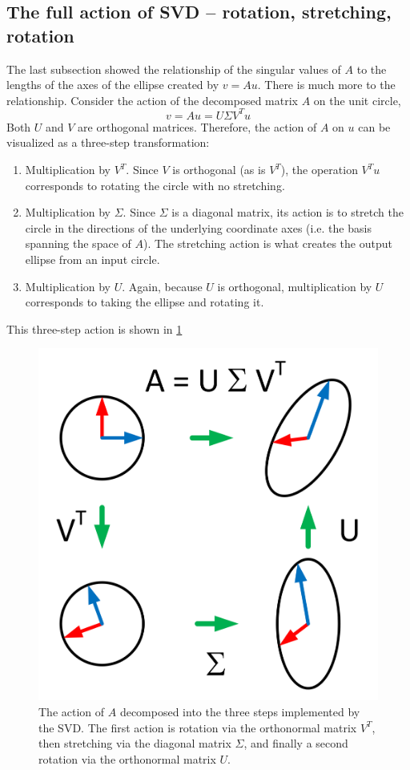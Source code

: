 \documentclass[onefignum,onetabnum]{siamart190516}
\begin{document}
\subsection{The full action of SVD -- rotation, stretching, rotation}
\label{rotstretchrot}
The last subsection showed the relationship of the singular values 
of $A$ to the lengths of the axes of the ellipse created by $v = A u$.
There is much more to the relationship.  Consider the action of the decomposed
matrix $A$ on the unit circle,
\begin{equation}
v = A u = U \Sigma V^T u
\end{equation}
Both $U$ and $V$ are orthogonal matrices.  Therefore, the action of $A$ on $u$
can be visualized as a three-step transformation:
\begin{enumerate}
	\item Multiplication by $V^T$.  Since $V$ is orthogonal (as is $V^T$),
	the operation $V^T u$ corresponds to rotating the circle with no stretching.
	\item Multiplication by $\Sigma$.  Since $\Sigma$ is a diagonal matrix, its action
	is to stretch the circle in the directions of the 
	underlying coordinate axes (i.e. the basis spanning the space of $A$).
	The stretching action is what creates the output ellipse from an input circle.
	\item Multiplication by $U$.  Again,  because $U$ is orthogonal, multiplication
	by $U$ corresponds to taking the ellipse and rotating it.
\end{enumerate}
This three-step action is shown in \cref{fig:ActionOfSVDOnCircle} 
\begin{figure}[thb]
	\centering
	\includegraphics[width=0.4\columnwidth]{ActionOfSVDOnCircle.png}
	\caption{The action of $A$ decomposed into the three steps implemented by the SVD.
	The first action is rotation via the orthonormal matrix $V^T$, then stretching
	via the diagonal matrix $\Sigma$, and finally a second rotation via the orthonormal
	matrix $U$.}
	\label{fig:ActionOfSVDOnCircle}
\end{figure}
\end{document}
